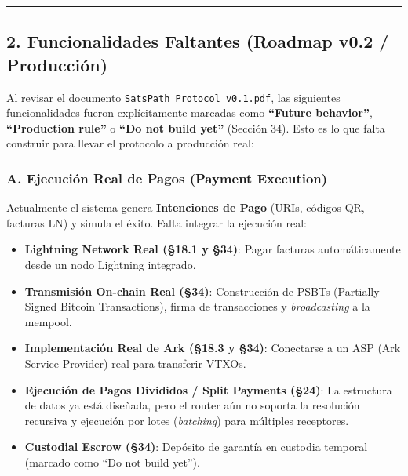 \documentclass[
]{article}
\providecommand{\tightlist}{%
  \setlength{\itemsep}{0pt}\setlength{\parskip}{0pt}}
\begin{document}
\begin{center}\rule{0.5\linewidth}{0.5pt}\end{center}

\hypertarget{funcionalidades-faltantes-roadmap-v0.2-producciuxf3n}{%
\subsection{2. Funcionalidades Faltantes (Roadmap v0.2 /
Producción)}\label{funcionalidades-faltantes-roadmap-v0.2-producciuxf3n}}

Al revisar el documento \texttt{SatsPath\ Protocol\ v0.1.pdf}, las
siguientes funcionalidades fueron explícitamente marcadas como
\textbf{``Future behavior''}, \textbf{``Production rule''} o
\textbf{``Do not build yet''} (Sección 34). Esto es lo que falta
construir para llevar el protocolo a producción real:

\hypertarget{a.-ejecuciuxf3n-real-de-pagos-payment-execution}{%
\subsubsection{A. Ejecución Real de Pagos (Payment
Execution)}\label{a.-ejecuciuxf3n-real-de-pagos-payment-execution}}

Actualmente el sistema genera \textbf{Intenciones de Pago} (URIs,
códigos QR, facturas LN) y simula el éxito. Falta integrar la ejecución
real:

\begin{itemize}
\tightlist
\item
  \textbf{Lightning Network Real (§18.1 y §34)}: Pagar facturas
  automáticamente desde un nodo Lightning integrado.
\item
  \textbf{Transmisión On-chain Real (§34)}: Construcción de PSBTs
  (Partially Signed Bitcoin Transactions), firma de transacciones y
  \emph{broadcasting} a la mempool.
\item
  \textbf{Implementación Real de Ark (§18.3 y §34)}: Conectarse a un ASP
  (Ark Service Provider) real para transferir VTXOs.
\item
  \textbf{Ejecución de Pagos Divididos / Split Payments (§24)}: La
  estructura de datos ya está diseñada, pero el router aún no soporta la
  resolución recursiva y ejecución por lotes (\emph{batching}) para
  múltiples receptores.
\item
  \textbf{Custodial Escrow (§34)}: Depósito de garantía en custodia
  temporal (marcado como ``Do not build yet'').
\end{itemize}
\end{document}
